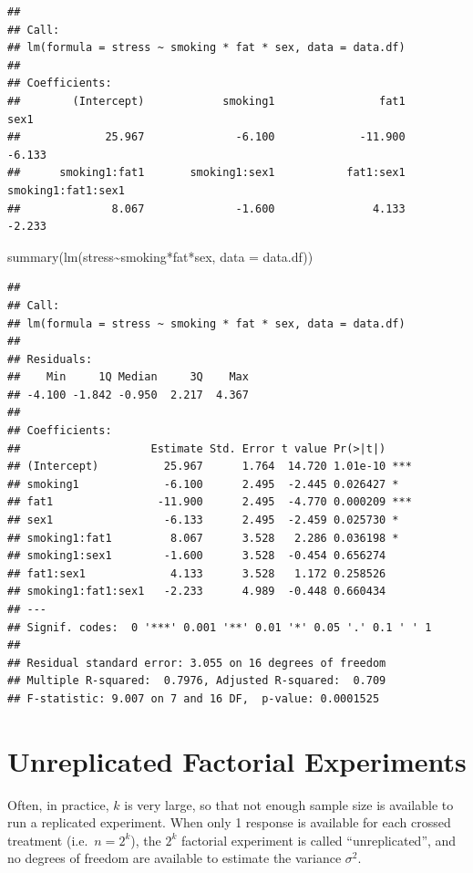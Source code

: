 \documentclass[
]{book}
\newenvironment{Shaded}{\begin{snugshade}}{\end{snugshade}}
\newcommand{\AttributeTok}[1]{\textcolor[rgb]{0.77,0.63,0.00}{#1}}
\newcommand{\FunctionTok}[1]{\textcolor[rgb]{0.00,0.00,0.00}{#1}}
\newcommand{\NormalTok}[1]{#1}
\newcommand{\SpecialCharTok}[1]{\textcolor[rgb]{0.00,0.00,0.00}{#1}}
\begin{document}
\begin{verbatim}
## 
## Call:
## lm(formula = stress ~ smoking * fat * sex, data = data.df)
## 
## Coefficients:
##        (Intercept)            smoking1                fat1                sex1  
##             25.967              -6.100             -11.900              -6.133  
##      smoking1:fat1       smoking1:sex1           fat1:sex1  smoking1:fat1:sex1  
##              8.067              -1.600               4.133              -2.233
\end{verbatim}

\begin{Shaded}
\begin{Highlighting}[]
\FunctionTok{summary}\NormalTok{(}\FunctionTok{lm}\NormalTok{(stress}\SpecialCharTok{\textasciitilde{}}\NormalTok{smoking}\SpecialCharTok{*}\NormalTok{fat}\SpecialCharTok{*}\NormalTok{sex, }\AttributeTok{data =}\NormalTok{ data.df))}
\end{Highlighting}
\end{Shaded}

\begin{verbatim}
## 
## Call:
## lm(formula = stress ~ smoking * fat * sex, data = data.df)
## 
## Residuals:
##    Min     1Q Median     3Q    Max 
## -4.100 -1.842 -0.950  2.217  4.367 
## 
## Coefficients:
##                    Estimate Std. Error t value Pr(>|t|)    
## (Intercept)          25.967      1.764  14.720 1.01e-10 ***
## smoking1             -6.100      2.495  -2.445 0.026427 *  
## fat1                -11.900      2.495  -4.770 0.000209 ***
## sex1                 -6.133      2.495  -2.459 0.025730 *  
## smoking1:fat1         8.067      3.528   2.286 0.036198 *  
## smoking1:sex1        -1.600      3.528  -0.454 0.656274    
## fat1:sex1             4.133      3.528   1.172 0.258526    
## smoking1:fat1:sex1   -2.233      4.989  -0.448 0.660434    
## ---
## Signif. codes:  0 '***' 0.001 '**' 0.01 '*' 0.05 '.' 0.1 ' ' 1
## 
## Residual standard error: 3.055 on 16 degrees of freedom
## Multiple R-squared:  0.7976, Adjusted R-squared:  0.709 
## F-statistic: 9.007 on 7 and 16 DF,  p-value: 0.0001525
\end{verbatim}

\hypertarget{unreplicated-factorial-experiments}{%
\section{Unreplicated Factorial Experiments}\label{unreplicated-factorial-experiments}}

Often, in practice, \(k\) is very large, so that not enough sample size is available to run a replicated experiment. When only 1 response is available for each crossed treatment (i.e.~\(n = 2^k\)), the \(2^k\) factorial experiment is called ``unreplicated'', and no degrees of freedom are available to estimate the variance \(\sigma^2\).
\end{document}
